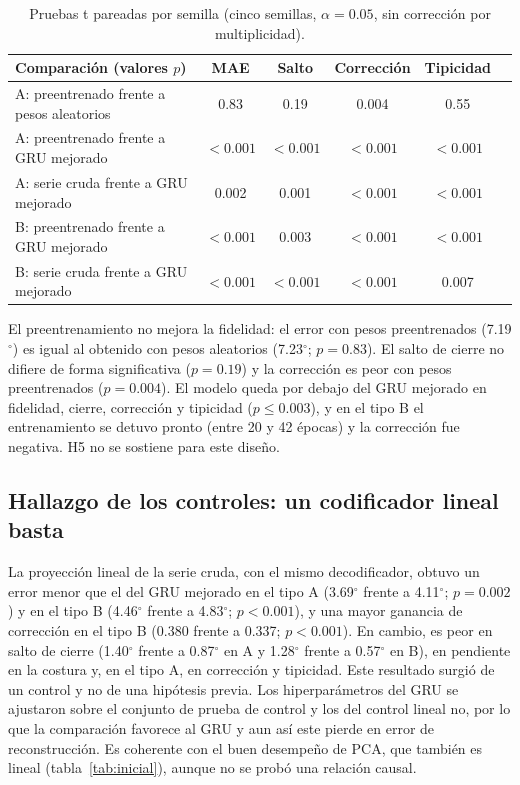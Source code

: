 \documentclass[11pt,a4paper]{amsart}
\newcommand{\gr}{$^{\circ}$}
\begin{document}
\begin{table}[h]
\centering\small
\begin{tabular}{lccccc}
\toprule
Comparación (valores $p$) & MAE & Salto & Corrección & Tipicidad \\
\midrule
A: preentrenado frente a pesos aleatorios & 0.83 & 0.19 & 0.004 & 0.55 \\
A: preentrenado frente a GRU mejorado & $<0.001$ & $<0.001$ & $<0.001$ & $<0.001$ \\
A: serie cruda frente a GRU mejorado & 0.002 & 0.001 & $<0.001$ & $<0.001$ \\
B: preentrenado frente a GRU mejorado & $<0.001$ & 0.003 & $<0.001$ & $<0.001$ \\
B: serie cruda frente a GRU mejorado & $<0.001$ & $<0.001$ & $<0.001$ & 0.007 \\
\bottomrule
\end{tabular}
\caption{Pruebas t pareadas por semilla (cinco semillas, $\alpha=0.05$, sin corrección por multiplicidad).}
\label{tab:fmp}
\end{table}

El preentrenamiento no mejora la fidelidad: el error con pesos preentrenados (7.19\gr) es igual al obtenido con pesos aleatorios (7.23\gr; $p=0.83$). El salto de cierre no difiere de forma significativa ($p=0.19$) y la corrección es peor con pesos preentrenados ($p=0.004$). El modelo queda por debajo del GRU mejorado en fidelidad, cierre, corrección y tipicidad ($p\le0.003$), y en el tipo B el entrenamiento se detuvo pronto (entre 20 y 42 épocas) y la corrección fue negativa. H5 no se sostiene para este diseño.

\subsection{Hallazgo de los controles: un codificador lineal basta}

La proyección lineal de la serie cruda, con el mismo decodificador, obtuvo un error menor que el del GRU mejorado en el tipo A (3.69\gr{} frente a 4.11\gr{}; $p=0.002$) y en el tipo B (4.46\gr{} frente a 4.83\gr{}; $p<0.001$), y una mayor ganancia de corrección en el tipo B (0.380 frente a 0.337; $p<0.001$). En cambio, es peor en salto de cierre (1.40\gr{} frente a 0.87\gr{} en A y 1.28\gr{} frente a 0.57\gr{} en B), en pendiente en la costura y, en el tipo A, en corrección y tipicidad. Este resultado surgió de un control y no de una hipótesis previa. Los hiperparámetros del GRU se ajustaron sobre el conjunto de prueba de control y los del control lineal no, por lo que la comparación favorece al GRU y aun así este pierde en error de reconstrucción. Es coherente con el buen desempeño de PCA, que también es lineal (tabla~\ref{tab:inicial}), aunque no se probó una relación causal.
\end{document}
